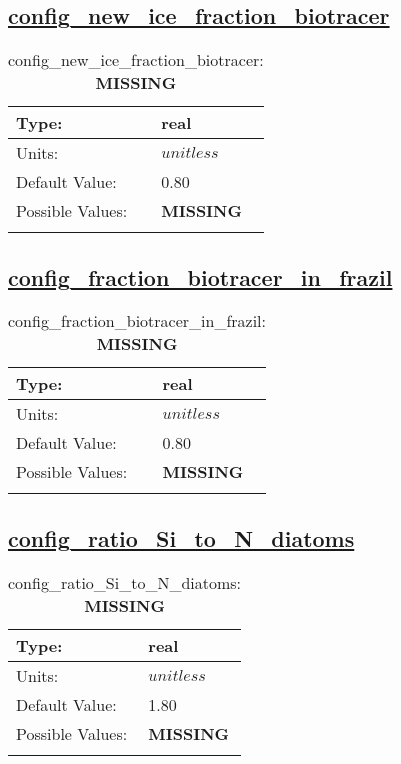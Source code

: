 \subsection[config\_new\_ice\_fraction\_biotracer]{\hyperref[sec:nm_tab_biogeochemistry]{config\_new\_ice\_fraction\_biotracer}}
\label{subsec:nm_sec_config_new_ice_fraction_biotracer}
\begin{center}
\begin{longtable}{| p{2.0in} || p{4.0in} |}
    \hline
    Type: & real \\
    \hline
    Units: & $unitless$ \\
    \hline
    Default Value: & 0.80 \\
    \hline
    Possible Values: & {\bf \color{red} MISSING} \\
    \hline
    \caption{config\_new\_ice\_fraction\_biotracer: {\bf \color{red} MISSING}}
\end{longtable}
\end{center}
\subsection[config\_fraction\_biotracer\_in\_frazil]{\hyperref[sec:nm_tab_biogeochemistry]{config\_fraction\_biotracer\_in\_frazil}}
\label{subsec:nm_sec_config_fraction_biotracer_in_frazil}
\begin{center}
\begin{longtable}{| p{2.0in} || p{4.0in} |}
    \hline
    Type: & real \\
    \hline
    Units: & $unitless$ \\
    \hline
    Default Value: & 0.80 \\
    \hline
    Possible Values: & {\bf \color{red} MISSING} \\
    \hline
    \caption{config\_fraction\_biotracer\_in\_frazil: {\bf \color{red} MISSING}}
\end{longtable}
\end{center}
\subsection[config\_ratio\_Si\_to\_N\_diatoms]{\hyperref[sec:nm_tab_biogeochemistry]{config\_ratio\_Si\_to\_N\_diatoms}}
\label{subsec:nm_sec_config_ratio_Si_to_N_diatoms}
\begin{center}
\begin{longtable}{| p{2.0in} || p{4.0in} |}
    \hline
    Type: & real \\
    \hline
    Units: & $unitless$ \\
    \hline
    Default Value: & 1.80 \\
    \hline
    Possible Values: & {\bf \color{red} MISSING} \\
    \hline
    \caption{config\_ratio\_Si\_to\_N\_diatoms: {\bf \color{red} MISSING}}
\end{longtable}
\end{center}
